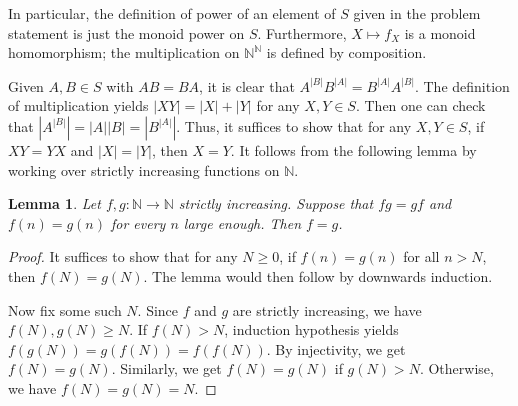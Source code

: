 \documentclass{article}
\newcommand{\N}{\mathbb{N}}
\newtheorem{lemma}{Lemma}
\begin{document}
In particular, the definition of power of an element of $S$ given in the problem statement is just the monoid power on $S$.
Furthermore, $X \mapsto f_X$ is a monoid homomorphism; the multiplication on $\N^\N$ is defined by composition.

Given $A, B \in S$ with $AB = BA$, it is clear that $A^{|B|} B^{|A|} = B^{|A|} A^{|B|}$.
The definition of multiplication yields $|XY| = |X| + |Y|$ for any $X, Y \in S$.
Then one can check that $|A^{|B|}| = |A||B| = |B^{|A|}|$.
Thus, it suffices to show that for any $X, Y \in S$, if $XY = YX$ and $|X| = |Y|$, then $X = Y$.
It follows from the following lemma by working over strictly increasing functions on $\N$.

\begin{lemma}\label{2017c7-2}
Let $f, g : \N \to \N$ strictly increasing.
Suppose that $fg = gf$ and $f(n) = g(n)$ for every $n$ large enough.
Then $f = g$.
\end{lemma}
\begin{proof}
It suffices to show that for any $N \geq 0$, if $f(n) = g(n)$ for all $n > N$, then $f(N) = g(N)$.
The lemma would then follow by downwards induction.

Now fix some such $N$.
Since $f$ and $g$ are strictly increasing, we have $f(N), g(N) \geq N$.
If $f(N) > N$, induction hypothesis yields $f(g(N)) = g(f(N)) = f(f(N))$.
By injectivity, we get $f(N) = g(N)$.
Similarly, we get $f(N) = g(N)$ if $g(N) > N$.
Otherwise, we have $f(N) = g(N) = N$.
\end{proof}
\end{document}
